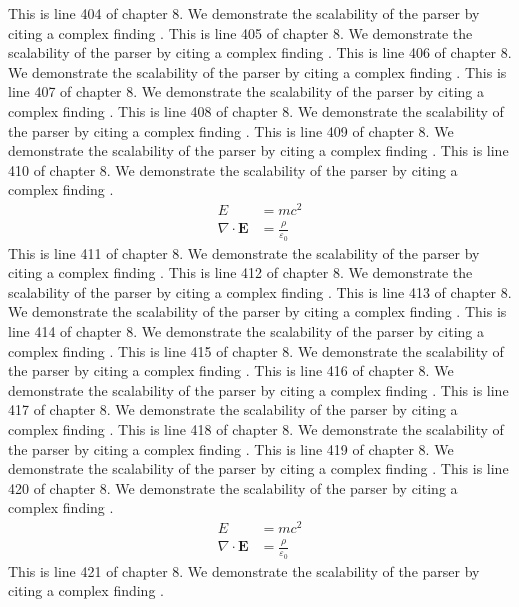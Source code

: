 This is line 404 of chapter 8. We demonstrate the scalability of the parser by citing a complex finding \cite{ref8_404}.
This is line 405 of chapter 8. We demonstrate the scalability of the parser by citing a complex finding \cite{ref8_405}.
This is line 406 of chapter 8. We demonstrate the scalability of the parser by citing a complex finding \cite{ref8_406}.
This is line 407 of chapter 8. We demonstrate the scalability of the parser by citing a complex finding \cite{ref8_407}.
This is line 408 of chapter 8. We demonstrate the scalability of the parser by citing a complex finding \cite{ref8_408}.
This is line 409 of chapter 8. We demonstrate the scalability of the parser by citing a complex finding \cite{ref8_409}.
This is line 410 of chapter 8. We demonstrate the scalability of the parser by citing a complex finding \cite{ref8_410}.
\begin{align*}
  E &= mc^2 \\
  \nabla \cdot \mathbf{E} &= \frac{\rho}{\varepsilon_0}
\end{align*}
This is line 411 of chapter 8. We demonstrate the scalability of the parser by citing a complex finding \cite{ref8_411}.
This is line 412 of chapter 8. We demonstrate the scalability of the parser by citing a complex finding \cite{ref8_412}.
This is line 413 of chapter 8. We demonstrate the scalability of the parser by citing a complex finding \cite{ref8_413}.
This is line 414 of chapter 8. We demonstrate the scalability of the parser by citing a complex finding \cite{ref8_414}.
This is line 415 of chapter 8. We demonstrate the scalability of the parser by citing a complex finding \cite{ref8_415}.
This is line 416 of chapter 8. We demonstrate the scalability of the parser by citing a complex finding \cite{ref8_416}.
This is line 417 of chapter 8. We demonstrate the scalability of the parser by citing a complex finding \cite{ref8_417}.
This is line 418 of chapter 8. We demonstrate the scalability of the parser by citing a complex finding \cite{ref8_418}.
This is line 419 of chapter 8. We demonstrate the scalability of the parser by citing a complex finding \cite{ref8_419}.
This is line 420 of chapter 8. We demonstrate the scalability of the parser by citing a complex finding \cite{ref8_420}.
\begin{align*}
  E &= mc^2 \\
  \nabla \cdot \mathbf{E} &= \frac{\rho}{\varepsilon_0}
\end{align*}
This is line 421 of chapter 8. We demonstrate the scalability of the parser by citing a complex finding \cite{ref8_421}.
